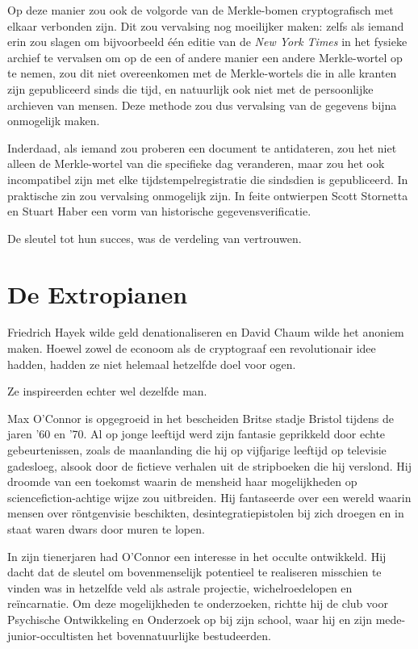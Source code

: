 \documentclass[
  a5paper,
  smalldemyvopaper,11pt,twoside,onecolumn,openright,extrafontsizes]{memoir}
\begin{document}
Op deze manier zou ook de volgorde van de Merkle-bomen cryptografisch
met elkaar verbonden zijn. Dit zou vervalsing nog moeilijker maken:
zelfs als iemand erin zou slagen om bijvoorbeeld één editie van de
\emph{New York Times} in het fysieke archief te vervalsen om op de een
of andere manier een andere Merkle-wortel op te nemen, zou dit niet
overeenkomen met de Merkle-wortels die in alle kranten zijn gepubliceerd
sinds die tijd, en natuurlijk ook niet met de persoonlijke archieven van
mensen. Deze methode zou dus vervalsing van de gegevens bijna onmogelijk
maken.

Inderdaad, als iemand zou proberen een document te antidateren, zou het
niet alleen de Merkle-wortel van die specifieke dag veranderen, maar zou
het ook incompatibel zijn met elke tijdstempelregistratie die sindsdien
is gepubliceerd. In praktische zin zou vervalsing onmogelijk zijn. In
feite ontwierpen Scott Stornetta en Stuart Haber een vorm van
historische gegevensverificatie.

De sleutel tot hun succes, was de verdeling van vertrouwen.

\chapter{De Extropianen}\label{de-extropianen}

Friedrich Hayek wilde geld denationaliseren en David Chaum wilde het
anoniem maken. Hoewel zowel de econoom als de cryptograaf een
revolutionair idee hadden, hadden ze niet helemaal hetzelfde doel voor
ogen.

Ze inspireerden echter wel dezelfde man.

Max O'Connor is opgegroeid in het bescheiden Britse stadje Bristol
tijdens de jaren '60 en '70. Al op jonge leeftijd werd zijn fantasie
geprikkeld door echte gebeurtenissen, zoals de maanlanding die hij op
vijfjarige leeftijd op televisie gadesloeg, alsook door de fictieve
verhalen uit de stripboeken die hij verslond. Hij droomde van een
toekomst waarin de mensheid haar mogelijkheden op sciencefiction-achtige
wijze zou uitbreiden. Hij fantaseerde over een wereld waarin mensen over
röntgenvisie beschikten, desintegratiepistolen bij zich droegen en in
staat waren dwars door muren te lopen.

In zijn tienerjaren had O'Connor een interesse in het occulte
ontwikkeld. Hij dacht dat de sleutel om bovenmenselijk potentieel te
realiseren misschien te vinden was in hetzelfde veld als astrale
projectie, wichelroedelopen en reïncarnatie. Om deze mogelijkheden te
onderzoeken, richtte hij de club voor Psychische Ontwikkeling en
Onderzoek op bij zijn school, waar hij en zijn mede-junior-occultisten
het bovennatuurlijke bestudeerden.
\end{document}
